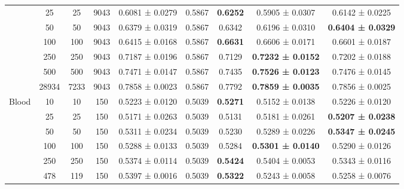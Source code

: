 \begin{table}
{\begin{tabular}[H]{@{}lcccccccc@{}}
                              & 25    & 25   & 9043 & 0.6081 ± 0.0279      & 0.5867               & \textbf{0.6252} & 0.5905 ± 0.0307          & 0.6142 ± 0.0225          \\
                              & 50    & 50   & 9043 & 0.6379 ± 0.0319      & 0.5867               & 0.6342          & 0.6196 ± 0.0310          & \textbf{0.6404 ± 0.0329} \\
                              & 100   & 100  & 9043 & 0.6415 ± 0.0168      & 0.5867               & \textbf{0.6631} & 0.6606 ± 0.0171          & 0.6601 ± 0.0187          \\
                              & 250   & 250  & 9043 & 0.7187 ± 0.0196      & 0.5867               & 0.7129          & \textbf{0.7232 ± 0.0152} & 0.7202 ± 0.0188          \\
                              & 500   & 500  & 9043 & 0.7471 ± 0.0147      & 0.5867               & 0.7435          & \textbf{0.7526 ± 0.0123} & 0.7476 ± 0.0145          \\
                              & 28934 & 7233 & 9043 & 0.7858 ± 0.0023      & 0.5867               & 0.7792          & \textbf{0.7859 ± 0.0035} & 0.7856 ± 0.0025          \\
                              \midrule
\multirow{6}{*}{Blood}        & 10    & 10   & 150  & 0.5223 ± 0.0120      & 0.5039               & \textbf{0.5271} & 0.5152 ± 0.0138          & 0.5226 ± 0.0120          \\
                              & 25    & 25   & 150  & 0.5171 ± 0.0263      & 0.5039               & 0.5131          & 0.5181 ± 0.0261          & \textbf{0.5207 ± 0.0238} \\
                              & 50    & 50   & 150  & 0.5311 ± 0.0234      & 0.5039               & 0.5230          & 0.5289 ± 0.0226          & \textbf{0.5347 ± 0.0245} \\
                              & 100   & 100  & 150  & 0.5288 ± 0.0133      & 0.5039               & 0.5284          & \textbf{0.5301 ± 0.0140} & 0.5290 ± 0.0126          \\
                              & 250   & 250  & 150  & 0.5374 ± 0.0114      & 0.5039               & \textbf{0.5424} & 0.5404 ± 0.0053          & 0.5343 ± 0.0116          \\
                              & 478   & 119  & 150  & 0.5397 ± 0.0016      & 0.5039               & \textbf{0.5322} & 0.5243 ± 0.0058          & 0.5258 ± 0.0076          \\
                              \midrule

\end{tabular}}
\end{table}

